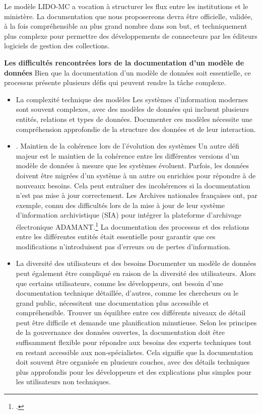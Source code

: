 Le modèle LIDO-MC a vocation à structurer les flux entre les institutions et le ministère. La documentation que nous proposereons devra être officielle, validée, à la fois compréhensible au plus grand nombre dans son but, et techniquement plus complexe pour permettre des développements de connecteurs par les éditeurs logiciels de gestion des collections. \newline

\textbf{Les difficultés rencontrées lors de la documentation d’un modèle de données}\newline
Bien que la documentation d’un modèle de données soit essentielle, ce processus présente plusieurs défis qui peuvent rendre la tâche complexe.
\begin{itemize}
    \item La complexité technique des modèles
Les systèmes d'information modernes sont souvent complexes, avec des modèles de données qui incluent plusieurs entités, relations et types de données. Documenter ces modèles nécessite une compréhension approfondie de la structure des données et de leur interaction. 
    \item. Maintien de la cohérence lors de l'évolution des systèmes
Un autre défi majeur est le maintien de la cohérence entre les différentes versions d’un modèle de données à mesure que les systèmes évoluent. Parfois, les données doivent être migrées d'un système à un autre ou enrichies pour répondre à de nouveaux besoins. Cela peut entraîner des incohérences si la documentation n'est pas mise à jour correctement. 
Les Archives nationales françaises ont, par exemple, connu des difficultés lors de la mise à jour de leur système d’information archivistique (SIA) pour intégrer la plateforme d’archivage électronique ADAMANT.\footcite{clavaud} La documentation des processus et des relations entre les différentes entités était essentielle pour garantir que ces modifications n'introduisent pas d'erreurs ou de pertes d'information.
    \item La diversité des utilisateurs et des besoins
Documenter un modèle de données peut également être compliqué en raison de la diversité des utilisateurs. Alors que certains utilisateurs, comme les développeurs, ont besoin d'une documentation technique détaillée, d'autres, comme les chercheurs ou le grand public, nécessitent une documentation plus accessible et compréhensible. Trouver un équilibre entre ces différents niveaux de détail peut être difficile et demande une planification minutieuse.
Selon les principes de la gouvernance des données ouvertes, la documentation doit être 
suffisamment flexible pour répondre aux besoins des experts techniques tout en restant accessible aux non-spécialistes. Cela signifie que la documentation doit souvent être organisée en plusieurs couches, avec des détails techniques plus approfondis pour les développeurs et des explications plus simples pour les utilisateurs non techniques.

\end{itemize}

